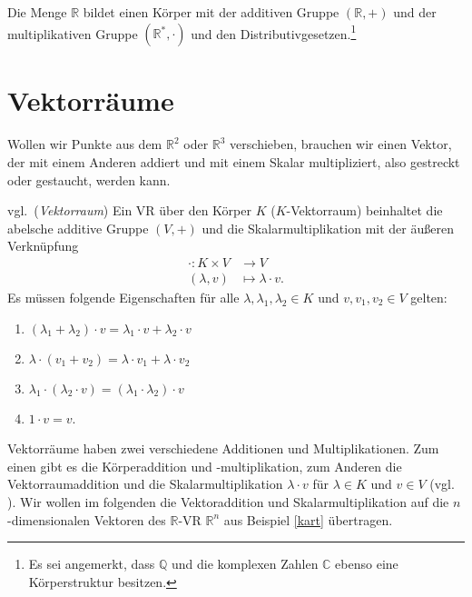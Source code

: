 \theoremstyle{example}
\begin{example}
Die Menge $\mathbb{R}$ bildet einen Körper mit der additiven Gruppe $(\mathbb{R},+)$ und der multiplikativen Gruppe $(\mathbb{R}^*,\cdot)$ und den Distributivgesetzen.\footnote{Es sei angemerkt, dass $\mathbb{Q}$ und die komplexen Zahlen $\mathbb{C}$ ebenso eine Körperstruktur besitzen.}
\end{example}


\newpage
\section{Vektorräume}
\label{sec:VR}
Wollen wir Punkte aus dem $\mathbb{R}^2$ oder $\mathbb{R}^3$ verschieben, brauchen wir einen Vektor, der mit einem Anderen addiert und mit einem Skalar multipliziert, also gestreckt oder gestaucht, werden kann. 


\begin{definition}vgl.\,\cite[S. 28, 6.1]{Skript} (\emph{Vektorraum}) \label{VR-axiome}Ein \acl{VR} über den Körper $K$ ($K$-Vektorraum) beinhaltet die abelsche additive Gruppe $(V,+)$ und die Skalarmultiplikation mit der äußeren Verknüpfung 
	\begin{align*}
	\cdot : K \times V &\rightarrow V
	\\ (\lambda,v) &\mapsto \lambda \cdot v\text{.}
	\end{align*}
Es müssen folgende Eigenschaften für alle $\lambda, \lambda_1, \lambda_2 \in K$ und $v, v_1, v_2 \in V$ gelten:
	\begin{enumerate}
		\item $(\lambda_1 + \lambda_2) \cdot v = \lambda_1 \cdot v + 	\lambda_2 \cdot v $
		\item $ \lambda \cdot (v_1 + v_2) = \lambda \cdot v_1 + \lambda \cdot v_2$
		\item $\lambda_1 \cdot (\lambda_2 \cdot v) = (\lambda_1 \cdot \lambda_2) \cdot v$
		\item $ 1 \cdot v = v$.{\grqq}
	\end{enumerate}
\end{definition}


Vektorräume haben zwei verschiedene Additionen und Multiplikationen. Zum einen gibt es die Körperaddition und -multiplikation, zum Anderen die Vektorraumaddition und die Skalarmultiplikation \(\lambda \cdot v \) für $\lambda \in K$ und $v \in V$ (vgl. \cite[S. 28, 6.1]{Skript}).
\newpage Wir wollen im folgenden die Vektoraddition und Skalarmultiplikation auf die $n$-dimensionalen Vektoren des $\mathbb{R}$-\acl{VR} $\mathbb{R}^n$ aus Beispiel \ref{kart} übertragen.
  
